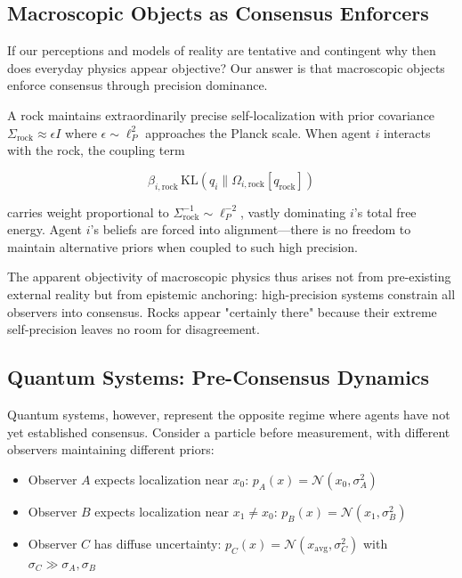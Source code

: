 \documentclass[11pt]{article}
\begin{document}
\subsection{Macroscopic Objects as Consensus Enforcers}

If our perceptions and models of reality are tentative and contingent why then does everyday physics appear objective? Our answer is that macroscopic objects enforce consensus through precision dominance.

A rock maintains extraordinarily precise self-localization with prior 
covariance $\Sigma_{\mathrm{rock}} \approx \epsilon I$ where $\epsilon \sim \ell_P^2$ approaches the Planck scale. When agent $i$ interacts with the rock, the coupling term

\begin{equation}
\beta_{i,\mathrm{rock}} \, \mathrm{KL}(q_i \| \Omega_{i,\mathrm{rock}}[q_{\mathrm{rock}}])
\end{equation}

carries weight proportional to $\Sigma_{\mathrm{rock}}^{-1} \sim \ell_P^{-2}$, vastly dominating $i$'s total free energy. Agent $i$'s beliefs are forced into alignment—there is no freedom to maintain alternative priors when coupled to such high precision.

The apparent objectivity of macroscopic physics thus arises not from 
pre-existing external reality but from epistemic anchoring: high-precision systems constrain all observers into consensus. Rocks 
appear "certainly there" because their extreme self-precision leaves 
no room for disagreement.

\subsection{Quantum Systems: Pre-Consensus Dynamics}

Quantum systems, however, represent the opposite regime where agents have not yet established consensus. Consider a particle before measurement, with different observers maintaining different priors:

\begin{itemize}
\item Observer $A$ expects localization near $x_0$: 
      $p_A(x) = \mathcal{N}(x_0, \sigma_A^2)$
\item Observer $B$ expects localization near $x_1 \neq x_0$: 
      $p_B(x) = \mathcal{N}(x_1, \sigma_B^2)$  
\item Observer $C$ has diffuse uncertainty: 
      $p_C(x) = \mathcal{N}(x_{\text{avg}}, \sigma_C^2)$ with $\sigma_C \gg \sigma_A, \sigma_B$
\end{itemize}
\end{document}
